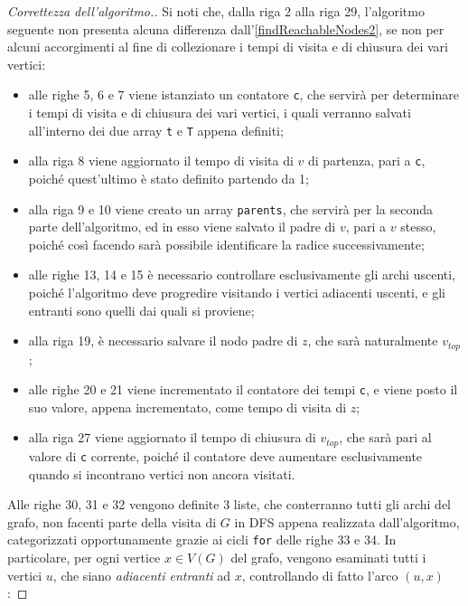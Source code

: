 \documentclass[a4paper, 12pt]{report}
\begin{document}
    \begin{proof}[Correttezza dell'algoritmo.]
        Si noti che, dalla riga 2 alla riga 29, l'algoritmo seguente non presenta alcuna differenza dall'\cref{findReachableNodes2}, se non per alcuni accorgimenti al fine di collezionare i tempi di visita e di chiusura dei vari vertici:

        \begin{itemize}
            \item alle righe 5, 6 e 7 viene istanziato un contatore \texttt{c}, che servirà per determinare i tempi di visita e di chiusura dei vari vertici, i quali verranno salvati all'interno dei due array \texttt{t} e \texttt{T} appena definiti;
            \item alla riga 8 viene aggiornato il tempo di visita di $v$ di partenza, pari a \texttt{c}, poiché quest'ultimo è stato definito partendo da 1;
            \item alla riga 9 e 10 viene creato un array \texttt{parents}, che servirà per la seconda parte dell'algoritmo, ed in esso viene salvato il padre di $v$, pari a $v$ stesso, poiché così facendo sarà possibile identificare la radice successivamente;
            \item alle righe 13, 14 e 15 è necessario controllare esclusivamente gli archi uscenti, poiché l'algoritmo deve progredire visitando i vertici adiacenti uscenti, e gli entranti sono quelli dai quali si proviene;
            \item alla riga 19, è necessario salvare il nodo padre di $z$, che sarà naturalmente $v_{top}$;
            \item alle righe 20 e 21 viene incrementato il contatore dei tempi \texttt{c}, e viene posto il suo valore, appena incrementato, come tempo di visita di $z$;
            \item alla riga 27 viene aggiornato il tempo di chiusura di $v_{top}$, che sarà pari al valore di \texttt{c} corrente, poiché il contatore deve aumentare esclusivamente quando si incontrano vertici non ancora visitati.
        \end{itemize}

        Alle righe 30, 31 e 32 vengono definite 3 liste, che conterranno tutti gli archi del grafo, non facenti parte della visita di $G$ in DFS appena realizzata dall'algoritmo, categorizzati opportunamente grazie ai cicli \texttt{for} delle righe 33 e 34. In particolare, per ogni vertice $x \in V(G)$ del grafo, vengono esaminati tutti i vertici $u$, che siano \textit{adiacenti entranti} ad $x$, controllando di fatto l'arco $(u, x)$:


\end{proof}
\end{document}
